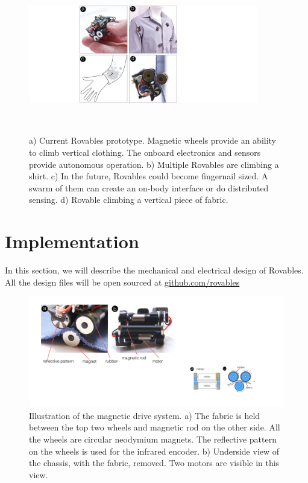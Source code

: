 \begin{figure}[!t]
\centering
  \includegraphics[width=10.0cm]{pictures/chapter4/front_pic_medium.pdf}
  \caption{a) Current Rovables prototype. Magnetic wheels provide an ability to climb vertical clothing. The onboard electronics and sensors provide autonomous operation. b) Multiple Rovables are climbing a shirt. c) In the future, Rovables could become fingernail sized. A swarm of them can create an on-body interface or do distributed sensing. d) Rovable climbing a vertical piece of fabric.}~
    \label{fig:front_pic}
\end{figure}

\section{Implementation}
In this section, we will describe the mechanical and electrical design of Rovables. All the design files will be open sourced at \href{http://github.com/rovables/}{github.com/rovables}



\begin{figure}[!h]
\centering
\includegraphics[width=1\columnwidth]{pictures/chapter4/drive_system.pdf}
\caption{Illustration of the magnetic drive system. a) The fabric is held between the top two wheels and magnetic rod on the other side. All the wheels are circular neodymium magnets. The reflective pattern on the wheels is used for the infrared encoder.  b) Underside view of the chassis, with the fabric, removed. Two motors are visible in this view.}
\label{fig:drive_system}
\end{figure}


